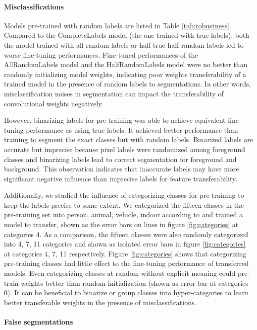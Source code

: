 \paragraph{Misclassifications}

Models pre-trained with random labels are listed in Table \ref{tab:robustness}.
Compared to the CompleteLabels model (the one trained with true labels), both the model trained with all random labels or half true half random labels led to worse fine-tuning performances.
Fine-tuned performances of the AllRandomLabels model and the HalfRandomLabels model were no better than randomly initializing model weights, indicating poor weights transferability of a trained model in the presence of random labels to segmentations.
In other words, misclassification noises in segmentation can impact the transferability of convolutional weights negatively.

However, binarizing labels for pre-training was able to achieve equivalent fine-tuning performance as using true labels.
It achieved better performance than training to segment the exact classes but with random labels.
Binarized labels are accurate but imprecise because pixel labels were randomized among foreground classes and binarizing labels lead to correct segmentation for foreground and background.
This observation indicates that inaccurate labels may have more significant negative influence than imprecise labels for feature transferability.

Additionally, we studied the influence of categorizing classes for pre-training to keep the labels precise to some extent.
We categorized the fifteen classes in the pre-training set into person, animal, vehicle, indoor according to  \cite{everingham2015pascal} and trained a model to transfer, shown as the error bars on lines in figure \ref{fig:categories} at categories 4.
As a comparison, the fifteen classes were also randomly categorized into 4, 7, 11 categories and shown as isolated error bars in figure \ref{fig:categories} at categories 4, 7, 11 respectively.
Figure \ref{fig:categories} shows that categorizing pre-training classes had little effect to the fine-tuning performance of transferred models.
Even categorizing classes at random without explicit meaning could pre-train weights better than random initialization (shown as error bar at categories 0).
It can be beneficial to binarize or group classes into hyper-categories to learn better transferable weights in the presence of misclassifications.

\paragraph{False segmentations}

